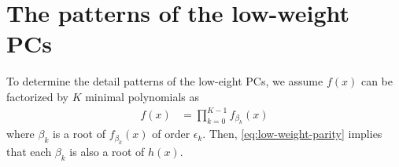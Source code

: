 \section{The patterns of the low-weight PCs}
\label{sec3}

To determine the detail patterns of the low-eight PCs, we assume $f(x)$ can be factorized by $K$ minimal polynomials as 
\begin{align}
f(x)&=\prod_{k=0}^{K-1}f_{\beta_k}(x)
\end{align}
where $\beta_k$ is a root of $f_{\beta_k}(x)$ of order $\epsilon_k$.
Then, \eqref{eq:low-weight-parity} implies that each $\beta_k$ is also a root of $h(x)$. 








